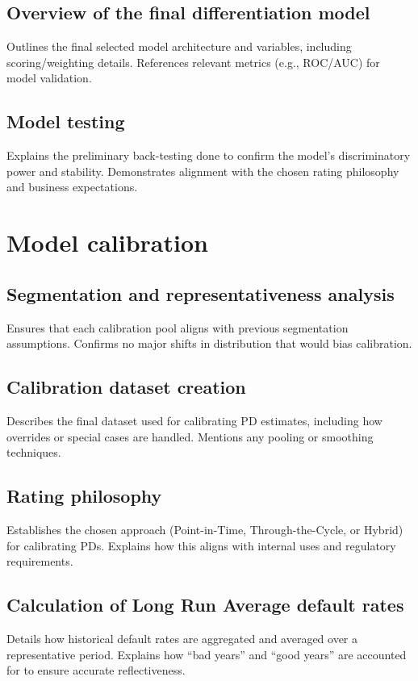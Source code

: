 \documentclass[12pt,a4paper]{article}
\begin{document}
\subsection{Overview of the final differentiation model}
Outlines the final selected model architecture and variables, including scoring/weighting details. References relevant metrics (e.g., ROC/AUC) for model validation.

\subsection{Model testing}
Explains the preliminary back-testing done to confirm the model’s discriminatory power and stability. Demonstrates alignment with the chosen rating philosophy and business expectations.

\section{Model calibration}

\subsection{Segmentation and representativeness analysis}
Ensures that each calibration pool aligns with previous segmentation assumptions. Confirms no major shifts in distribution that would bias calibration.

\subsection{Calibration dataset creation}
Describes the final dataset used for calibrating PD estimates, including how overrides or special cases are handled. Mentions any pooling or smoothing techniques.

\subsection{Rating philosophy}
Establishes the chosen approach (Point-in-Time, Through-the-Cycle, or Hybrid) for calibrating PDs. Explains how this aligns with internal uses and regulatory requirements.

\subsection{Calculation of Long Run Average default rates}
Details how historical default rates are aggregated and averaged over a representative period. Explains how “bad years” and “good years” are accounted for to ensure accurate reflectiveness.
\end{document}
